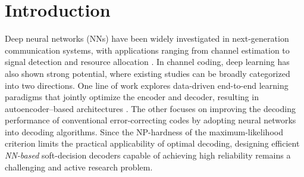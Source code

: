 \documentclass[lettersize,onecolumn]{IEEEtran}
\begin{document}


\section{Introduction}

Deep neural networks (NNs) have been widely investigated in next-generation communication systems, with applications ranging from channel estimation to signal detection and resource allocation \cite{soltani2019DLbasedchannelestimation,hu2020DLforChannelEsitimationSurvey,arvinte2022mimoChannelEstimationusingGenerativeModels,khani2020adaptiveSignalDetectionforMIMO,gu2021knowledgeassistedDLin5Gto6G,jiang2022accurateChannelPredictionTransformer}. In channel coding, deep learning has also shown strong potential, where existing studies can be broadly categorized into two directions. One line of work explores data-driven end-to-end learning paradigms that jointly optimize the encoder and decoder, resulting in autoencoder–based architectures \cite{jiang2019turboAE,makkuva2021KOCodes,jamali2022productae,zhang2023adaptiveProductAE,choukroun2024learningECC}. The other focuses on improving the decoding performance of conventional error-correcting codes by adopting neural networks into decoding algorithms. Since the NP-hardness of the maximum-likelihood criterion limits the practical applicability of optimal decoding, designing efficient \emph{NN-based} soft-decision decoders capable of achieving high reliability remains a challenging and active research problem.
\end{document}
